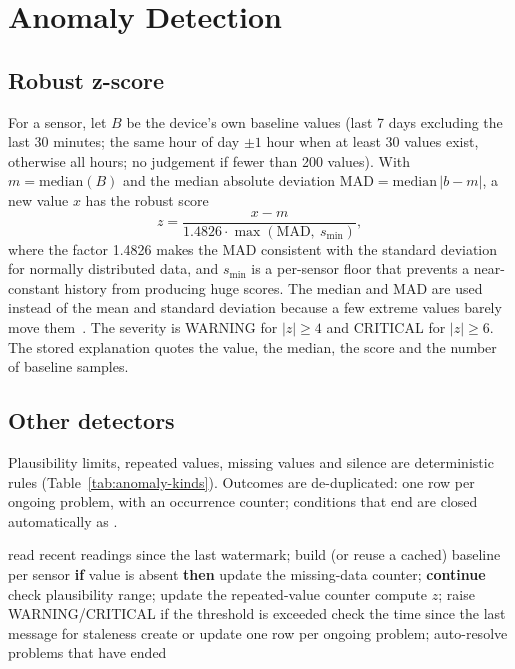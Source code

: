 \documentclass[12pt,a4paper,oneside]{report}
\newcommand{\code}[1]{\texttt{\detokenize{#1}}}
\begin{document}
\section{Anomaly Detection}
\subsection{Robust z-score}
For a sensor, let $B$ be the device's own baseline values (last 7 days excluding the last 30 minutes; the same hour of day $\pm1$ hour when at least 30 values exist, otherwise all hours; no judgement if fewer than 200 values). With $m=\mathrm{median}(B)$ and the median absolute deviation $\mathrm{MAD}=\mathrm{median}\,|b-m|$, a new value $x$ has the robust score
\begin{equation}
  z=\frac{x-m}{1.4826\cdot\max(\mathrm{MAD},\ s_{\min})} ,
\end{equation}
where the factor 1.4826 makes the MAD consistent with the standard deviation for normally distributed data, and $s_{\min}$ is a per-sensor floor that prevents a near-constant history from producing huge scores. The median and MAD are used instead of the mean and standard deviation because a few extreme values barely move them~\cite{leys2013mad}. The severity is WARNING for $|z|\ge4$ and CRITICAL for $|z|\ge6$. The stored explanation quotes the value, the median, the score and the number of baseline samples.

\subsection{Other detectors}
Plausibility limits, repeated values, missing values and silence are deterministic rules (Table~\ref{tab:anomaly-kinds}). Outcomes are de-duplicated: one row per ongoing problem, with an occurrence counter; conditions that end are closed automatically as \code{AUTO_RESOLVED}.

\begin{algorithm}[H]
\caption{Anomaly scan of one device}
\label{alg:scan}
\begin{algorithmic}[1]
\State read recent readings since the last watermark; build (or reuse a cached) baseline per sensor
  \State \textbf{if} value is absent \textbf{then} update the missing-data counter; \textbf{continue}
  \State check plausibility range; update the repeated-value counter
   \State compute $z$; raise WARNING/CRITICAL if the threshold is exceeded \EndIf
\EndFor
\State check the time since the last message for staleness
\State create or update one row per ongoing problem; auto-resolve problems that have ended
\end{algorithmic}
\end{algorithm}
\end{document}
